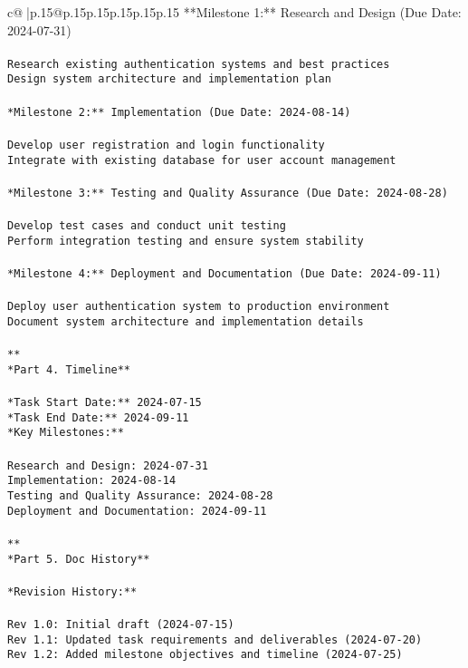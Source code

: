 \documentclass{article}
\begin{document}
{\begin{supertabular}{c@{$\;$}|p{.15\linewidth}@{}p{.15\linewidth}p{.15\linewidth}p{.15\linewidth}p{.15\linewidth}p{.15\linewidth}}
{{{**Milestone 1:** Research and Design (Due Date: 2024-07-31)\\ \tt \\ \tt * Research existing authentication systems and best practices\\ \tt * Design system architecture and implementation plan\\ \tt \\ \tt **Milestone 2:** Implementation (Due Date: 2024-08-14)\\ \tt \\ \tt * Develop user registration and login functionality\\ \tt * Integrate with existing database for user account management\\ \tt \\ \tt **Milestone 3:** Testing and Quality Assurance (Due Date: 2024-08-28)\\ \tt \\ \tt * Develop test cases and conduct unit testing\\ \tt * Perform integration testing and ensure system stability\\ \tt \\ \tt **Milestone 4:** Deployment and Documentation (Due Date: 2024-09-11)\\ \tt \\ \tt * Deploy user authentication system to production environment\\ \tt * Document system architecture and implementation details\\ \tt \\ \tt ***\\ \tt **Part 4. Timeline**\\ \tt \\ \tt **Task Start Date:** 2024-07-15\\ \tt **Task End Date:** 2024-09-11\\ \tt **Key Milestones:**\\ \tt \\ \tt * Research and Design: 2024-07-31\\ \tt * Implementation: 2024-08-14\\ \tt * Testing and Quality Assurance: 2024-08-28\\ \tt * Deployment and Documentation: 2024-09-11\\ \tt \\ \tt ***\\ \tt **Part 5. Doc History**\\ \tt \\ \tt **Revision History:**\\ \tt \\ \tt * Rev 1.0: Initial draft (2024-07-15)\\ \tt * Rev 1.1: Updated task requirements and deliverables (2024-07-20)\\ \tt * Rev 1.2: Added milestone objectives and timeline (2024-07-25)\\ \tt \\ \tt }}}
\end{supertabular}}
\end{document}
